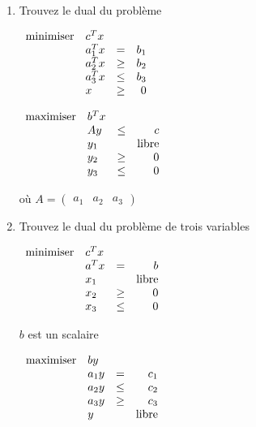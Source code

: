 \begin{enumerate}
  \item Trouvez le dual du problème

    $
    \begin{array}{llcr}
      \mbox{minimiser} & c^T x\\
      & a_1^T x& = & b_1\\
      & a_2^T  x & \geq & b_2\\
      & a_3^T x & \leq & b_3\\
      & x& \geq & 0
    \end{array}
    $

    \begin{solution}
      $
      \begin{array}{llcr}
        \mbox{maximiser} & b^T x\\
        & Ay & \leq & c\\
        & y_1 & & \text{libre}\\
        & y_2 & \geq & 0\\
        & y_3 & \leq & 0
      \end{array}
      $

      où $A = \begin{pmatrix}a_1 & a_2 & a_3\end{pmatrix}$
    \end{solution}

  \item Trouvez le dual du problème de trois variables

    $
    \begin{array}{llcr}
      \mbox{minimiser} & c^T x\\
      & a^T x& = & b\\
      & x_1 &  & \mbox{libre}\\
      & x_2 & \geq & 0\\
      & x_3 & \leq & 0
    \end{array}
    $

    \begin{solution}
      $b$ est un scalaire

      $
      \begin{array}{llcr}
        \mbox{maximiser} & b y\\
        & a_1 y & = & c_1\\
        & a_2 y & \leq & c_2\\
        & a_3 y & \geq & c_3\\
        & y & & \text{libre}
      \end{array}
      $
    \end{solution}


\end{enumerate}
